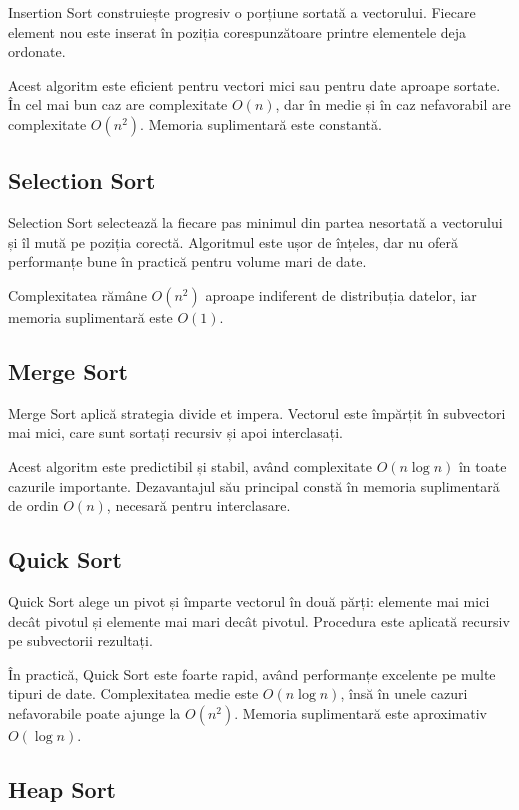 \documentclass[12pt,a4paper]{article}
\begin{document}
Insertion Sort construiește progresiv o porțiune sortată a vectorului. Fiecare element nou este inserat în poziția corespunzătoare printre elementele deja ordonate.

Acest algoritm este eficient pentru vectori mici sau pentru date aproape sortate. În cel mai bun caz are complexitate $O(n)$, dar în medie și în caz nefavorabil are complexitate $O(n^2)$. Memoria suplimentară este constantă.

\subsection{Selection Sort}

Selection Sort selectează la fiecare pas minimul din partea nesortată a vectorului și îl mută pe poziția corectă. Algoritmul este ușor de înțeles, dar nu oferă performanțe bune în practică pentru volume mari de date.

Complexitatea rămâne $O(n^2)$ aproape indiferent de distribuția datelor, iar memoria suplimentară este $O(1)$.

\subsection{Merge Sort}

Merge Sort aplică strategia divide et impera. Vectorul este împărțit în subvectori mai mici, care sunt sortați recursiv și apoi interclasați.

Acest algoritm este predictibil și stabil, având complexitate $O(n \log n)$ în toate cazurile importante. Dezavantajul său principal constă în memoria suplimentară de ordin $O(n)$, necesară pentru interclasare.

\subsection{Quick Sort}

Quick Sort alege un pivot și împarte vectorul în două părți: elemente mai mici decât pivotul și elemente mai mari decât pivotul. Procedura este aplicată recursiv pe subvectorii rezultați.

În practică, Quick Sort este foarte rapid, având performanțe excelente pe multe tipuri de date. Complexitatea medie este $O(n \log n)$, însă în unele cazuri nefavorabile poate ajunge la $O(n^2)$. Memoria suplimentară este aproximativ $O(\log n)$.

\subsection{Heap Sort}
\end{document}
